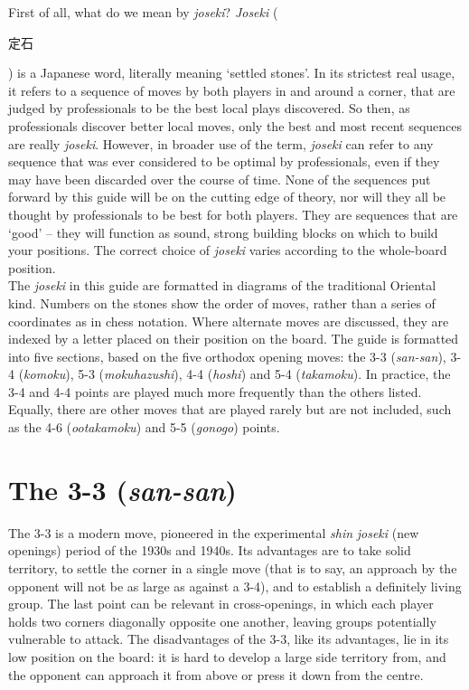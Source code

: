 \documentclass[a5paper,12pt,twoside]{book} %
\newcounter{joseki}                 %
\begin{document}
First of all, what do we mean by \textit{joseki}? \textit{Joseki} (\begin{CJK}{UTF8}{min}定石\end{CJK}) is a Japanese word, literally meaning `settled stones'. In its strictest real usage, it refers to a sequence of moves by both players in and around a corner, that are judged by professionals to be the best local plays discovered. So then, as professionals discover better local moves, only the best and most recent sequences are really \textit{joseki}. However, in broader use of the term, \textit{joseki} can refer to any sequence that was ever considered to be optimal by professionals, even if they may have been discarded over the course of time. None of the sequences put forward by this guide will be on the cutting edge of theory, nor will they all be thought by professionals to be best for both players. They are sequences that are `good'  – they will function as sound, strong building blocks on which to build your positions. The correct choice of \textit{joseki} varies according to the whole-board position.\\

The \textit{joseki} in this guide are formatted in diagrams of the traditional Oriental kind. Numbers on the stones show the order of moves, rather than a series of coordinates as in chess notation. Where alternate moves are discussed, they are indexed by a letter placed on their position on the board. The guide is formatted into five sections, based on the five orthodox opening moves: the 3-3 (\textit{san-san}), 3-4 (\textit{komoku}), 5-3 (\textit{mokuhazushi}), 4-4 (\textit{hoshi}) and 5-4 (\textit{takamoku}). In practice, the 3-4 and 4-4 points are played much more frequently than the others listed. Equally, there are other moves that are played rarely but are not included, such as the 4-6 (\textit{ootakamoku}) and 5-5 (\textit{gonogo}) points.\\

\mainmatter

\chapter{The 3-3 (\textit{san-san}) \label{sec:3-3}}
The 3-3 is a modern move, pioneered in the experimental \textit{shin} \textit{joseki} (new openings) period of the 1930s and 1940s. Its advantages are to take solid territory, to settle the corner in a single move (that is to say, an approach by the opponent will not be as large as against a 3-4), and to establish a definitely living group. The last point can be relevant in cross-openings, in which each player holds two corners diagonally opposite one another, leaving groups potentially vulnerable to attack. The disadvantages of the 3-3, like its advantages, lie in its low position on the board: it is hard to develop a large side territory from, and the opponent can approach it from above or press it down from the centre.\\
\end{document}
